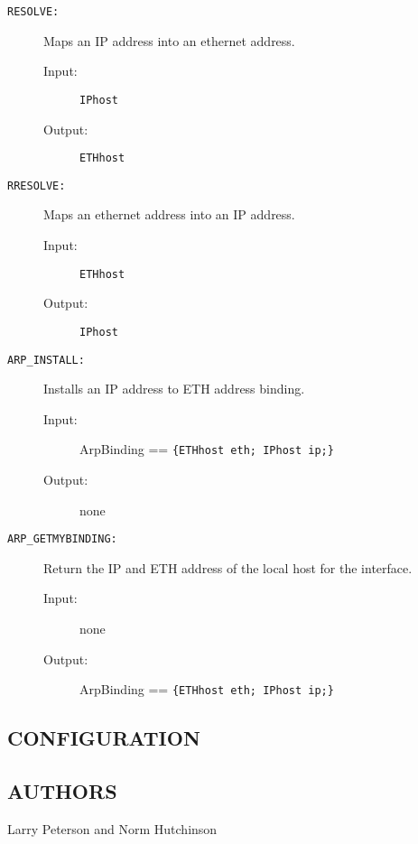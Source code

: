 \begin{description}

\item[{\tt RESOLVE:}]
Maps an IP address into an ethernet address.
\begin{description}
\item[{\rm Input:}] {\tt IPhost }
\item[{\rm Output:}] {\tt ETHhost}
\end{description}

\item[{\tt RRESOLVE:}]
Maps an ethernet address into an IP address.
\begin{description}
\item[{\rm Input:}] {\tt ETHhost}
\item[{\rm Output:}] {\tt IPhost}
\end{description}

\item[{\tt ARP\_INSTALL:}]
Installs an IP address to ETH address binding.
\begin{description}
\item[{\rm Input:}] { ArpBinding == \tt \{ETHhost eth; IPhost ip;\} }
\item[{\rm Output:}] none
\end{description}

\item[{\tt ARP\_GETMYBINDING:}]
Return the IP and ETH address of the local host for the interface.
\begin{description}
\item[{\rm Input:}] none
\item[{\rm Output:}] { ArpBinding == \tt \{ETHhost eth; IPhost ip;\} }
\end{description}


\end{description}

\subsection*{CONFIGURATION}


\subsection*{AUTHORS}

\noindent Larry Peterson and Norm Hutchinson
